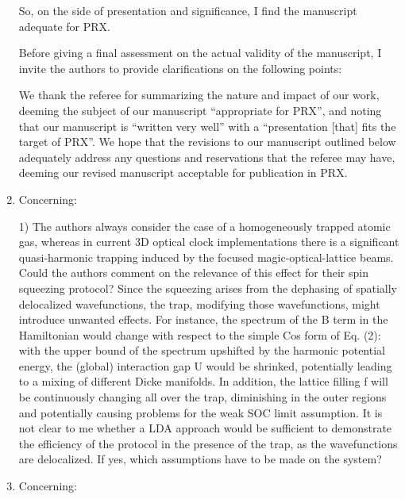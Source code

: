 \documentclass[reprint,onecolumn,12pt]{revtex4-2}
\newcommand{\blue}[1]{{\color{blue} #1}}
\begin{document}
\begin{enumerate}
  \blue{So, on the side of presentation and significance, I find the
    manuscript adequate for PRX.}

  \blue{Before giving a final assessment on the actual validity of the
    manuscript, I invite the authors to provide clarifications on the
    following points:}

  We thank the referee for summarizing the nature and impact of our
  work, deeming the subject of our manuscript ``appropriate for PRX'',
  and noting that our manuscript is ``written very well'' with a
  ``presentation [that] fits the target of PRX''.  We hope that the
  revisions to our manuscript outlined below adequately address any
  questions and reservations that the referee may have, deeming our
  revised manuscript acceptable for publication in PRX.


\item Concerning:

  \blue{1) The authors always consider the case of a homogeneously
    trapped atomic gas, whereas in current 3D optical clock
    implementations there is a significant quasi-harmonic trapping
    induced by the focused magic-optical-lattice beams. Could the
    authors comment on the relevance of this effect for their spin
    squeezing protocol? Since the squeezing arises from the dephasing
    of spatially delocalized wavefunctions, the trap, modifying those
    wavefunctions, might introduce unwanted effects. For instance, the
    spectrum of the B term in the Hamiltonian would change with
    respect to the simple Cos form of Eq. (2): with the upper bound of
    the spectrum upshifted by the harmonic potential energy, the
    (global) interaction gap U would be shrinked, potentially leading
    to a mixing of different Dicke manifolds. In addition, the lattice
    filling f will be continuously changing all over the trap,
    diminishing in the outer regions and potentially causing problems
    for the weak SOC limit assumption. It is not clear to me whether a
    LDA approach would be sufficient to demonstrate the efficiency of
    the protocol in the presence of the trap, as the wavefunctions are
    delocalized. If yes, which assumptions have to be made on the
    system?}



\item Concerning:


\end{enumerate}
\end{document}
